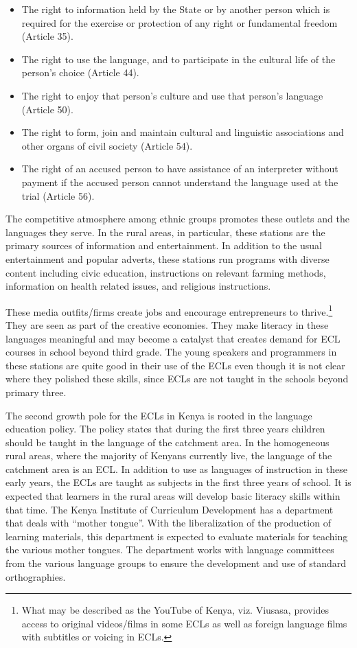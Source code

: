 \documentclass[output=paper,colorlinks,citecolor=brown]{langscibook}
\begin{document}
\begin{itemize}
    \item The right to information held by the State or by another person which is required for the exercise or protection of any right or fundamental freedom (Article 35).
    \item The right to use the language, and to participate in the cultural life of the person’s choice (Article 44).
    \item The right to enjoy that person’s culture and use that person’s language (Article 50).
    \item The right to form, join and maintain cultural and linguistic associations and other organs of civil society (Article 54).
    \item The right of an accused person to have assistance of an interpreter without payment if the accused person cannot understand the language used  at the trial (Article 56).
\end{itemize}

The competitive atmosphere among ethnic groups promotes these outlets and the languages they serve. In the rural areas, in particular, these stations are the primary sources of information and entertainment.  In addition to the usual entertainment and popular adverts, these stations run programs with diverse content including civic education, instructions on relevant farming methods, information on health related issues, and religious instructions. 

These media outfits/firms create jobs and encourage entrepreneurs to thrive.\footnote{What may be described as the YouTube of Kenya, viz. Viusasa, provides access to original videos/films in some ECLs as well as foreign language films with subtitles or voicing in ECLs.} They are seen as part of the creative economies. They make literacy in these languages meaningful and may become a catalyst that creates demand for ECL courses in school beyond third grade. The young speakers and programmers in these stations are quite good in their use of the ECLs even though it is not clear where they polished these skills, since ECLs are not taught in the schools beyond primary three.

The second growth pole for the ECLs in Kenya is rooted in the language education policy. The policy states that during the first three years children should be taught in the language of the catchment area. In the homogeneous rural areas, where the majority of Kenyans currently live, the language of the catchment area is an ECL. In addition to use as languages of instruction in these early years, the ECLs are taught as subjects in the first three years of school.  It is expected that learners in the rural areas will develop basic literacy skills within that time.  The Kenya Institute of Curriculum Development has a department that deals with “mother tongue”.  With the liberalization of the production of learning materials, this department is expected to evaluate materials for teaching the various mother tongues.  The department works with language committees from the various language groups to ensure the development and use of standard orthographies.  
\end{document}
